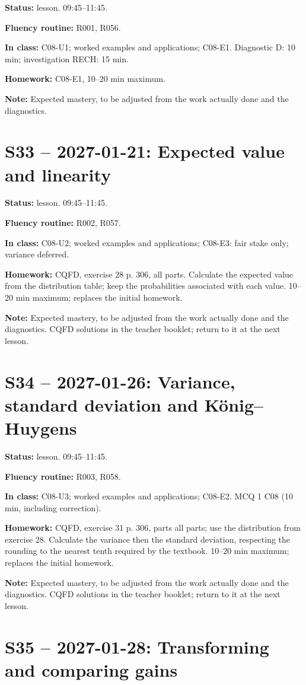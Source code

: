 \textbf{Status:} lesson. 09:45–11:45.\par\textbf{Fluency routine:} R001, R056.\par\textbf{In class:} C08-U1; worked examples and applications; C08-E1. Diagnostic D: 10 min; investigation RECH: 15 min.\par\textbf{Homework:} C08-E1, 10–20 min maximum.\par\textbf{Note:} Expected mastery, to be adjusted from the work actually done and the diagnostics.
\section*{S33 -- 2027-01-21: Expected value and linearity}
\textbf{Status:} lesson. 09:45–11:45.\par\textbf{Fluency routine:} R002, R057.\par\textbf{In class:} C08-U2; worked examples and applications; C08-E3: fair stake only; variance deferred. \par\textbf{Homework:} CQFD, exercise 28 p. 306, all parts. Calculate the expected value from the distribution table; keep the probabilities associated with each value. 10–20 min maximum; replaces the initial homework.\par\textbf{Note:} Expected mastery, to be adjusted from the work actually done and the diagnostics. CQFD solutions in the teacher booklet; return to it at the next lesson.
\section*{S34 -- 2027-01-26: Variance, standard deviation and König–Huygens}
\textbf{Status:} lesson. 09:45–11:45.\par\textbf{Fluency routine:} R003, R058.\par\textbf{In class:} C08-U3; worked examples and applications; C08-E2.  MCQ 1 C08 (10 min, including correction).\par\textbf{Homework:} CQFD, exercise 31 p. 306, parts all parts; use the distribution from exercise 28. Calculate the variance then the standard deviation, respecting the rounding to the nearest tenth required by the textbook. 10–20 min maximum; replaces the initial homework.\par\textbf{Note:} Expected mastery, to be adjusted from the work actually done and the diagnostics. CQFD solutions in the teacher booklet; return to it at the next lesson.
\section*{S35 -- 2027-01-28: Transforming and comparing gains}
